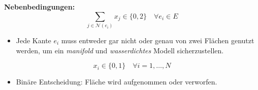 \begin{German}
    \vspace{1em}
    \noindent
    \textbf{Nebenbedingungen:}
    \[
    \sum_{j \in \mathcal{N}(e_i)} x_j \in \{0, 2\} \quad \forall e_i \in E
    \]
    \begin{itemize}
    \item Jede Kante $e_i$ muss entweder gar nicht oder genau von zwei Flächen genutzt werden, um ein \textit{manifold} und \textit{wasserdichtes} Modell sicherzustellen.
    \end{itemize}

    \[
    x_i \in \{0, 1\} \quad \forall i = 1, \dots, N
    \]
    \begin{itemize}
    \item Binäre Entscheidung: Fläche wird aufgenommen oder verworfen.
    \end{itemize}

\end{German}

